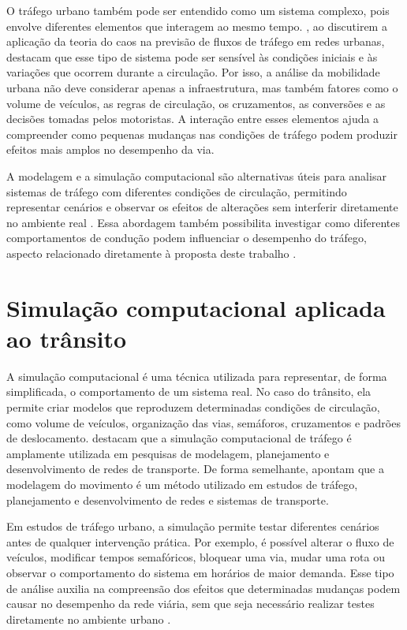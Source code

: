 O tráfego urbano também pode ser entendido como um sistema complexo, pois envolve diferentes elementos que interagem ao mesmo tempo. , ao discutirem a aplicação da teoria do caos na previsão de fluxos de tráfego em redes urbanas, destacam que esse tipo de sistema pode ser sensível às condições iniciais e às variações que ocorrem durante a circulação. Por isso, a análise da mobilidade urbana não deve considerar apenas a infraestrutura, mas também fatores como o volume de veículos, as regras de circulação, os cruzamentos, as conversões e as decisões tomadas pelos motoristas. A interação entre esses elementos ajuda a compreender como pequenas mudanças nas condições de tráfego podem produzir efeitos mais amplos no desempenho da via.

A modelagem e a simulação computacional são alternativas úteis para analisar sistemas de tráfego com diferentes condições de circulação, permitindo representar cenários e observar os efeitos de alterações sem interferir diretamente no ambiente real \cite{dorokhin_2020}. Essa abordagem também possibilita investigar como diferentes comportamentos de condução podem influenciar o desempenho do tráfego, aspecto relacionado diretamente à proposta deste trabalho \cite{zhai_2021}.

\section{Simulação computacional aplicada ao trânsito}

A simulação computacional é uma técnica utilizada para representar, de forma simplificada, o comportamento de um sistema real. No caso do trânsito, ela permite criar modelos que reproduzem determinadas condições de circulação, como volume de veículos, organização das vias, semáforos, cruzamentos e padrões de deslocamento.  destacam que a simulação computacional de tráfego é amplamente utilizada em pesquisas de modelagem, planejamento e desenvolvimento de redes de transporte. De forma semelhante,  apontam que a modelagem do movimento é um método utilizado em estudos de tráfego, planejamento e desenvolvimento de redes e sistemas de transporte.

Em estudos de tráfego urbano, a simulação permite testar diferentes cenários antes de qualquer intervenção prática. Por exemplo, é possível alterar o fluxo de veículos, modificar tempos semafóricos, bloquear uma via, mudar uma rota ou observar o comportamento do sistema em horários de maior demanda. Esse tipo de análise auxilia na compreensão dos efeitos que determinadas mudanças podem causar no desempenho da rede viária, sem que seja necessário realizar testes diretamente no ambiente urbano \cite{dorokhin_2020}.

